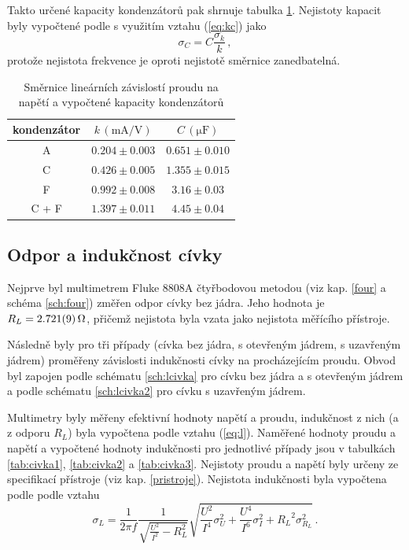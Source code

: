 \documentclass{../concepts/prepareprotokol} %
\newcommand{\relative}[1]{
\frac{\sigma_{#1}}{#1}
}
\begin{document}
Takto určené kapacity kondenzátorů pak shrnuje tabulka \ref{tab:kapacity}. Nejistoty kapacit byly vypočtené podle \cite{englich} s využitím vztahu (\ref{eq:kc}) jako
\begin{equation}
    \sigma_C = C \relative{k} \, ,
\end{equation}
protože nejistota frekvence je oproti nejistotě směrnice zanedbatelná.

\begin{table}[!htbp]
\centering
\caption{Směrnice lineárních závislostí proudu na napětí a vypočtené kapacity kondenzátorů}
\begin{tabular}{c|cc}
 \toprule
 kondenzátor & $k\, (\mathrm{mA/V})$ & $C\, (\unit{\micro\farad})$ \\
 \midrule
 A & $0.204 \pm 0.003$ & $0.651 \pm 0.010$ \\
 C & $0.426 \pm 0.005$ & $1.355 \pm 0.015$ \\
 F & $0.992 \pm 0.008$ & $3.16 \pm 0.03$ \\
 C + F & $1.397 \pm 0.011$ & $4.45 \pm 0.04$ \\
 \bottomrule
\end{tabular}
\label{tab:kapacity}
\end{table}

\subsection{Odpor a indukčnost cívky}

Nejprve byl multimetrem Fluke 8808A čtyřbodovou metodou (viz kap. \ref{four} a schéma \ref{sch:four}) změřen odpor cívky bez jádra. Jeho hodnota je $R_L = \qty{2.721\pm0.009}{\ohm}$, přičemž nejistota byla vzata jako nejistota měřícího přístroje.

Následně byly pro tři případy (cívka bez jádra, s otevřeným jádrem, s uzavřeným jádrem) proměřeny závislosti indukčnosti cívky na procházejícím proudu. Obvod byl zapojen podle schématu \ref{sch:lcivka} pro cívku bez jádra a s otevřeným jádrem a podle schématu \ref{sch:lcivka2} pro cívku s uzavřeným jádrem. 

Multimetry byly měřeny efektivní hodnoty napětí a proudu, indukčnost z nich (a z odporu $R_L$) byla vypočtena podle vztahu (\ref{eq:l}). Naměřené hodnoty proudu a napětí a vypočtené hodnoty indukčnosti pro jednotlivé případy jsou v tabulkách \ref{tab:civka1}, \ref{tab:civka2} a \ref{tab:civka3}. Nejistoty proudu a napětí byly určeny ze specifikací přístroje (viz kap. \ref{pristroje}). Nejistota indukčnosti byla vypočtena podle \cite{englich} podle vztahu
\begin{equation}
    \sigma_L = \frac{1}{2 \pi f} \frac{1}{\sqrt{\frac{U^2}{I^2} - R_L^2}} \sqrt{\frac{U^2}{I^4}\sigma_U^2 + \frac{U^4}{I^6} \sigma_I^2 + {R_L}^2 \sigma_{R_L}^2} \, .
\end{equation}
\end{document}
